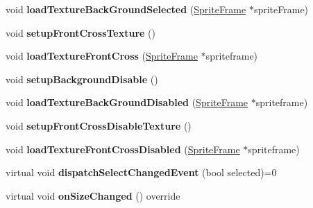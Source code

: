 \begin{DoxyCompactItemize}
void {\bfseries load\+Texture\+Back\+Ground\+Selected} (\hyperlink{classSpriteFrame}{Sprite\+Frame} $\ast$sprite\+Frame)
\item 
\mbox{\label{classui_1_1AbstractCheckButton_a3c0e8f11a25ea2b931126e1f444d740b}} 
void {\bfseries setup\+Front\+Cross\+Texture} ()
\item 
\mbox{\label{classui_1_1AbstractCheckButton_ace6534b9e2814b64e61330ee05c86d94}} 
void {\bfseries load\+Texture\+Front\+Cross} (\hyperlink{classSpriteFrame}{Sprite\+Frame} $\ast$spriteframe)
\item 
\mbox{\label{classui_1_1AbstractCheckButton_abe60616e4d5dc68661686d8d2ed17284}} 
void {\bfseries setup\+Background\+Disable} ()
\item 
\mbox{\label{classui_1_1AbstractCheckButton_ac5011dfae46f5f5d676fd48ecb5c1399}} 
void {\bfseries load\+Texture\+Back\+Ground\+Disabled} (\hyperlink{classSpriteFrame}{Sprite\+Frame} $\ast$spriteframe)
\item 
\mbox{\label{classui_1_1AbstractCheckButton_a5be6e61f423304f89b0c12486b798767}} 
void {\bfseries setup\+Front\+Cross\+Disable\+Texture} ()
\item 
\mbox{\label{classui_1_1AbstractCheckButton_a1d9def119477f9cba2bc55191645e016}} 
void {\bfseries load\+Texture\+Front\+Cross\+Disabled} (\hyperlink{classSpriteFrame}{Sprite\+Frame} $\ast$spriteframe)
\item 
\mbox{\label{classui_1_1AbstractCheckButton_ac704c19d4c87d252d8a5974ede1742ac}} 
virtual void {\bfseries dispatch\+Select\+Changed\+Event} (bool selected)=0
\item 
\mbox{\label{classui_1_1AbstractCheckButton_ad908a1aeca7cb97b26b511a6be430f0e}} 
virtual void {\bfseries on\+Size\+Changed} () override
\item 
\mbox{\label{classui_1_1AbstractCheckButton_a57dbde7a14afe446af934ac488553761}} 

\end{DoxyCompactItemize}
